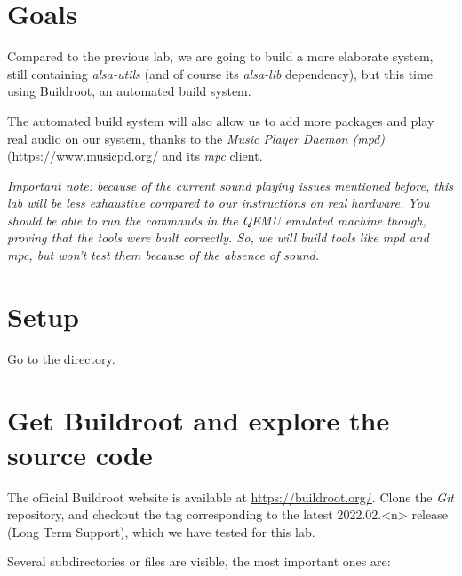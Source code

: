 
\section{Goals}

Compared to the previous lab, we are going to build a more elaborate
system, still containing {\em alsa-utils} (and of course its {\em
alsa-lib} dependency), but this time using Buildroot,
an automated build system.

The automated build system will also allow us to add more packages
and play real audio on our system, thanks to the {\em Music Player
Daemon (mpd)} (\url{https://www.musicpd.org/} and its {\em mpc} client.

{\em Important note: because of the current sound playing issues
mentioned before, this lab will be less exhaustive compared to our
instructions on real hardware. You should be able to run the commands
in the QEMU emulated machine though, proving that the tools were built
correctly. So, we will build tools like mpd and mpc, but won't test
them because of the absence of sound.}

\section{Setup}

Go to the  directory.

\section{Get Buildroot and explore the source code}

The official Buildroot website is available at
\url{https://buildroot.org/}. Clone the {\em Git} repository, and
checkout the tag corresponding to the latest 2022.02.<n> release (Long
Term Support), which we have tested for this lab.

Several subdirectories or files are visible, the most important ones
are:


